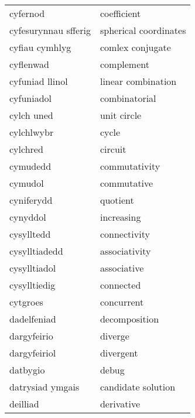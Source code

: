 \begin{supertabular}{p{0.22\textwidth}p{0.22\textwidth}}
                       cyfernod &                      coefficient \\
           cyfesurynnau sfferig &            spherical coordinates \\
                 cyfiau cymhlyg &                 comlex conjugate \\
                      cyflenwad &                       complement \\
                cyfuniad llinol &               linear combination \\
                     cyfuniadol &                    combinatorial \\
                     cylch uned &                      unit circle \\
                     cylchlwybr &                            cycle \\
                       cylchred &                          circuit \\
                       cymudedd &                    commutativity \\
                        cymudol &                      commutative \\
                     cyniferydd &                         quotient \\
                       cynyddol &                       increasing \\
                     cysylltedd &                     connectivity \\
                  cysylltiadedd &                    associativity \\
                   cysylltiadol &                      associative \\
                   cysylltiedig &                        connected \\
                       cytgroes &                       concurrent \\
                    dadelfeniad &                    decomposition \\
                    dargyfeirio &                          diverge \\
                   dargyfeiriol &                        divergent \\
                       datbygio &                            debug \\
               datrysiad ymgais &               candidate solution \\
                       deilliad &                       derivative \\

\end{supertabular}
